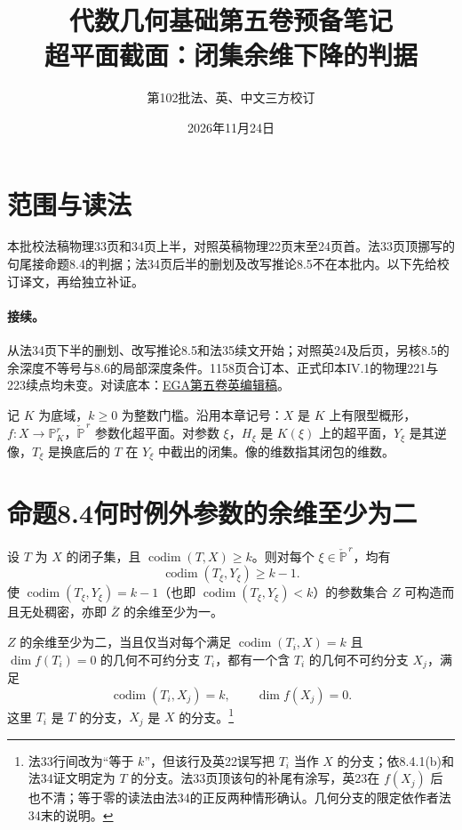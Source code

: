 \documentclass[openany,fontset=fandol]{ctexbook}
\DeclareMathOperator{\codim}{codim}
\newcommand{\PP}{\mathbb P}
\begin{document}
\title{代数几何基础第五卷预备笔记\\超平面截面：闭集余维下降的判据}
\author{第102批\quad 法、英、中文三方校订}
\date{2026年11月24日}
\maketitle

\section*{范围与读法}
本批校法稿物理33页和34页上半，对照英稿物理22页末至24页首。法33页顶挪写的句尾接命题8.4的判据；法34页后半的删划及改写推论8.5不在本批内。以下先给校订译文，再给独立补证。

\paragraph{接续。}
从法34页下半的删划、改写推论8.5和法35续文开始；对照英24及后页，另核8.5的余深度不等号与8.6的局部深度条件。1158页合订本、正式印本IV.1的物理221与223续点均未变。对读底本：\href{https://webusers.imj-prg.fr/~leila.schneps/grothendieckcircle/EGA/EGA5trans.pdf}{EGA第五卷英编辑稿}。

记 $K$ 为底域，$k\ge0$ 为整数门槛。沿用本章记号：$X$ 是 $K$ 上有限型概形，$f:X\to\PP^r_K$，$\check{\PP}^{\,r}$ 参数化超平面。对参数 $\xi$，$H_\xi$ 是 $K(\xi)$ 上的超平面，$Y_\xi$ 是其逆像，$T_\xi$ 是换底后的 $T$ 在 $Y_\xi$ 中截出的闭集。像的维数指其闭包的维数。

\section*{命题8.4\quad 何时例外参数的余维至少为二}
设 $T$ 为 $X$ 的闭子集，且 $\codim(T,X)\ge k$。则对每个 $\xi\in\check{\PP}^{\,r}$，均有
\[
 \codim(T_\xi,Y_\xi)\ge k-1.
\]
使 $\codim(T_\xi,Y_\xi)=k-1$（也即 $\codim(T_\xi,Y_\xi)<k$）的参数集合 $Z$ 可构造而且无处稠密，亦即 $\overline Z$ 的余维至少为一。

$Z$ 的余维至少为二，当且仅当对每个满足 $\codim(T_i,X)=k$ 且 $\dim f(T_i)=0$ 的几何不可约分支 $T_i$，都有一个含 $T_i$ 的几何不可约分支 $X_j$，满足
\[
 \codim(T_i,X_j)=k,\qquad \dim f(X_j)=0.
\]
这里 $T_i$ 是 $T$ 的分支，$X_j$ 是 $X$ 的分支。\footnote{法33行间改为“等于 $k$”，但该行及英22误写把 $T_i$ 当作 $X$ 的分支；依8.4.1(b)和法34证文明定为 $T$ 的分支。法33页顶该句的补尾有涂写，英23在 $f(X_j)$ 后也不清；等于零的读法由法34的正反两种情形确认。几何分支的限定依作者法34末的说明。}
\end{document}
